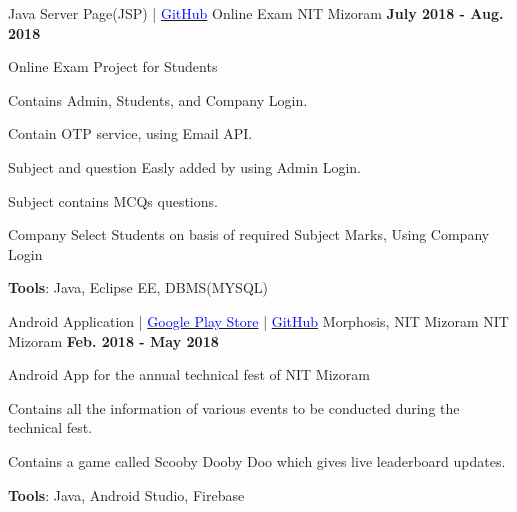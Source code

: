 \begin{cventries}
    \cventry
    {Java Server Page(JSP) | \href{https://github.com/saurabhsunil95/Online-Exam-Project}{\textcolor{Blue}{GitHub}}}
    {Online Exam }
    {NIT Mizoram}
    {\textbf{July 2018 - Aug. 2018}}
    {
      \begin{cvitems}
        \item {Online Exam Project for Students}
        \item{Contains Admin, Students, and Company Login.}
        \item{Contain OTP service, using Email API.}
        \item{Subject and question Easly added by using Admin Login.}
        \item{Subject contains MCQs questions.}
        \item{Company Select Students on basis of required Subject Marks, Using Company Login}
        \item{\textbf{Tools}: Java, Eclipse EE, DBMS(MYSQL)}
      \end{cvitems}
    }

    \cventry
    {Android Application | \href{https://play.google.com/store/apps/details?id=com.nitmz.morphosis&hl=en}{\textcolor{Blue}{Google Play Store}} | \href{https://github.com/morphosis-nitmz/Morphosis-2k17-Android}{\textcolor{Blue}{GitHub}}}
    {Morphosis, NIT Mizoram}
    {NIT Mizoram}
    {\textbf{Feb. 2018 - May 2018}}
    {
      \begin{cvitems}
        \item {Android App for the annual technical fest of NIT Mizoram}
        \item{Contains all the information of various events to be conducted during the technical fest.}
        \item{Contains a game called Scooby Dooby Doo which gives live leaderboard updates.}
        \item{\textbf{Tools}: Java, Android Studio, Firebase}
      \end{cvitems}
    }
    
\end{cventries}  